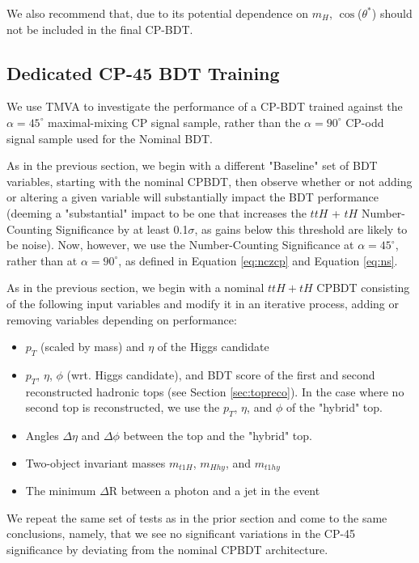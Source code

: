 We also recommend that, due to its potential dependence on $m_{H}$, $\cos$($\theta^{*}$) should not be included in the final CP-BDT.

\subsection{Dedicated CP-45 BDT Training}

We use TMVA to investigate the performance of a CP-BDT trained against the $\alpha = 45^{\circ}$ maximal-mixing CP signal sample, rather than the $\alpha = 90^{\circ}$ CP-odd signal sample used for the Nominal BDT.

As in the previous section, we begin with a different "Baseline" set of BDT variables, starting with the nominal CPBDT, then observe whether or not adding or altering a given variable will substantially impact the BDT performance (deeming a "substantial" impact to be one that increases the $ttH$ + $tH$ Number-Counting Significance by at least 0.1$\sigma$, as gains below this threshold are likely to be noise). Now, however, we use the Number-Counting Significance at $\alpha = 45^{\circ}$, rather than at $\alpha = 90^{\circ}$, as defined in Equation \ref{eq:nczcp} and Equation \ref{eq:ns}.

As in the previous section, we begin with a nominal $ttH+tH$ CPBDT consisting of the following input variables and modify it in an iterative process, adding or removing variables depending on performance:

\begin{itemize}
\item $p_{T}$ (scaled by mass) and $\eta$ of the Higgs candidate
\item $p_{T}$, $\eta$, $\phi$ (wrt. Higgs candidate), and BDT score of the first and second reconstructed hadronic tops (see Section \ref{sec:topreco}). In the case where no second top is reconstructed, we use the $p_{T}$, $\eta$, and $\phi$ of the "hybrid" top.
\item Angles $\Delta\eta$ and $\Delta\phi$ between the top and the "hybrid" top.
\item Two-object invariant masses $m_{t1H}$, $m_{Hhy}$, and $m_{t1hy}$
\item The minimum $\Delta$R between a photon and a jet in the event
\end{itemize}

We repeat the same set of tests as in the prior section and come to the same conclusions, namely, that we see no significant variations in the CP-45 significance by deviating from the nominal CPBDT architecture.

